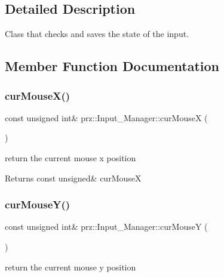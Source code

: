 \subsection{Detailed Description}
Class that checks and saves the state of the input. 



\subsection{Member Function Documentation}
\mbox{\label{classprz_1_1_input___manager_a401badf5d71a45de8ac2c66d1968afe2}} 
\subsubsection{\texorpdfstring{curMouseX()}{curMouseX()}}
{\footnotesize\ttfamily const unsigned int\& prz\+::\+Input\+\_\+\+Manager\+::cur\+MouseX (\begin{DoxyParamCaption}{ }\end{DoxyParamCaption})\hspace{0.3cm}{\ttfamily [inline]}}



return the current mouse x position 

\begin{DoxyReturn}{Returns}
const unsigned\& cur\+MouseX 
\end{DoxyReturn}
\mbox{\label{classprz_1_1_input___manager_a243d25eb8d2b06964571fcffc44aa480}} 
\subsubsection{\texorpdfstring{curMouseY()}{curMouseY()}}
{\footnotesize\ttfamily const unsigned int\& prz\+::\+Input\+\_\+\+Manager\+::cur\+MouseY (\begin{DoxyParamCaption}{ }\end{DoxyParamCaption})\hspace{0.3cm}{\ttfamily [inline]}}



return the current mouse y position 

